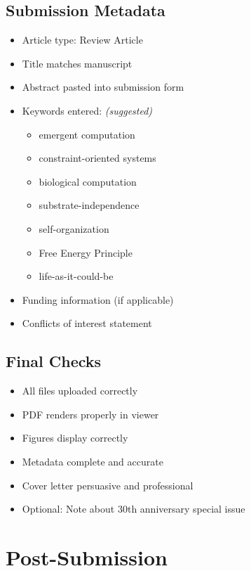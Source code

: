 \documentclass[11pt]{article}
\begin{document}
\subsection{Submission Metadata}

\begin{itemize}[label=$\square$]
    \item Article type: Review Article
    \item Title matches manuscript
    \item Abstract pasted into submission form
    \item Keywords entered: \textit{(suggested)}
    \begin{itemize}[label=$\circ$]
        \item emergent computation
        \item constraint-oriented systems
        \item biological computation
        \item substrate-independence
        \item self-organization
        \item Free Energy Principle
        \item life-as-it-could-be
    \end{itemize}
    \item Funding information (if applicable)
    \item Conflicts of interest statement
\end{itemize}

\subsection{Final Checks}

\begin{itemize}[label=$\square$]
    \item All files uploaded correctly
    \item PDF renders properly in viewer
    \item Figures display correctly
    \item Metadata complete and accurate
    \item Cover letter persuasive and professional
    \item Optional: Note about 30th anniversary special issue
\end{itemize}

\section{Post-Submission}
\end{document}
